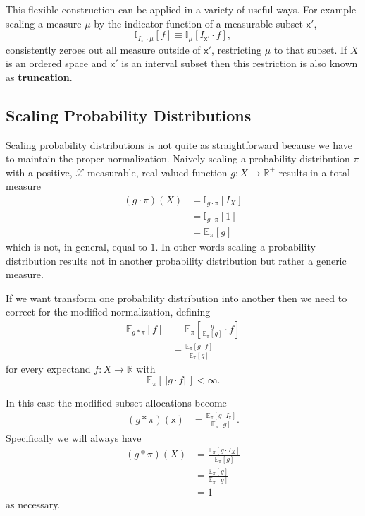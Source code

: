\documentclass[
  letterpaper,
  DIV=11,
  numbers=noendperiod]{scrartcl}
\begin{document}
This flexible construction can be applied in a variety of useful ways.
For example scaling a measure \(\mu\) by the indicator function of a
measurable subset \(\mathsf{x}'\), \[
\mathbb{I}_{I_{\mathsf{x}'} \cdot \mu} [ f ]
\equiv
\mathbb{I}_{\mu} [ I_{\mathsf{x}'} \cdot f ],
\] consistently zeroes out all measure outside of \(\mathsf{x}'\),
restricting \(\mu\) to that subset. If \(X\) is an ordered space and
\(\mathsf{x}'\) is an interval subset then this restriction is also
known as \textbf{truncation}.

\hypertarget{scaling-probability-distributions}{%
\subsection{Scaling Probability
Distributions}\label{scaling-probability-distributions}}

Scaling probability distributions is not quite as straightforward
because we have to maintain the proper normalization. Naively scaling a
probability distribution \(\pi\) with a positive,
\(\mathcal{X}\)-measurable, real-valued function
\(g : X \rightarrow \mathbb{R}^{+}\) results in a total measure
\begin{align*}
(g \cdot \pi)(X)
&=
\mathbb{I}_{g \cdot \pi} [ I_{X} ]
\\
&=
\mathbb{I}_{g \cdot \pi} [ 1 ]
\\
&=
\mathbb{E}_{\pi} [ g ]
\end{align*} which is not, in general, equal to \(1\). In other words
scaling a probability distribution results not in another probability
distribution but rather a generic measure.

If we want transform one probability distribution into another then we
need to correct for the modified normalization, defining \begin{align*}
\mathbb{E}_{g \ast \pi} [ f ]
&\equiv
\mathbb{E}_{\pi} \left[ \frac{g}{ \mathbb{E}_{\pi} [ g ] } \cdot f \right]
\\
&=
\frac{ \mathbb{E}_{\pi} [ g \cdot f ] }{ \mathbb{E}_{\pi} [ g ] }
\end{align*} for every expectand \(f: X \rightarrow \mathbb{R}\) with \[
\mathbb{E}_{\pi} [ \, | g \cdot f | \, ] < \infty.
\]

In this case the modified subset allocations become \begin{align*}
(g \ast \pi)(\mathsf{x})
&=
\frac{ \mathbb{E}_{\pi} [ g \cdot I_{\mathsf{x}} ] }
{ \mathbb{E}_{\pi} [ g ] }.
\end{align*} Specifically we will always have \begin{align*}
(g \ast \pi)(X)
&=
\frac{ \mathbb{E}_{\pi} [ g \cdot I_{X} ] }
{ \mathbb{E}_{\pi} [ g ] }
\\
&=
\frac{ \mathbb{E}_{\pi} [ g ] }
{ \mathbb{E}_{\pi} [ g ] }
\\
&=
1
\end{align*} as necessary.
\end{document}

